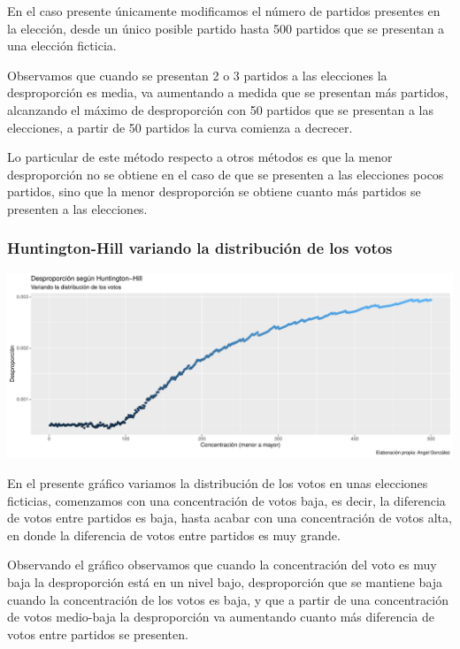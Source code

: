 \documentclass[12pt,a4paper,]{book}
\numberwithin{dummy}{section}
\theoremstyle{ocrenumbox}
\theoremstyle{blacknumex}
\theoremstyle{blacknumbox}
\theoremstyle{ocrenum}
\theoremstyle{ocrenum}
\begin{document}
En el caso presente únicamente modificamos el número de partidos
presentes en la elección, desde un único posible partido hasta 500
partidos que se presentan a una elección ficticia.

Observamos que cuando se presentan 2 o 3 partidos a las elecciones la
desproporción es media, va aumentando a medida que se presentan más
partidos, alcanzando el máximo de desproporción con 50 partidos que se
presentan a las elecciones, a partir de 50 partidos la curva comienza a
decrecer.

Lo particular de este método respecto a otros métodos es que la menor
desproporción no se obtiene en el caso de que se presenten a las
elecciones pocos partidos, sino que la menor desproporción se obtiene
cuanto más partidos se presenten a las elecciones.

\hypertarget{huntington-hill-variando-la-distribuciuxf3n-de-los-votos}{%
\subsubsection{Huntington-Hill variando la distribución de los
votos}\label{huntington-hill-variando-la-distribuciuxf3n-de-los-votos}}

\begin{center}\includegraphics[width=0.95\linewidth]{figurasR/unnamed-chunk-31-1} \end{center}

En el presente gráfico variamos la distribución de los votos en unas
elecciones ficticias, comenzamos con una concentración de votos baja, es
decir, la diferencia de votos entre partidos es baja, hasta acabar con
una concentración de votos alta, en donde la diferencia de votos entre
partidos es muy grande.

Observando el gráfico observamos que cuando la concentración del voto es
muy baja la desproporción está en un nivel bajo, desproporción que se
mantiene baja cuando la concentración de los votos es baja, y que a
partir de una concentración de votos medio-baja la desproporción va
aumentando cuanto más diferencia de votos entre partidos se presenten.
\end{document}
